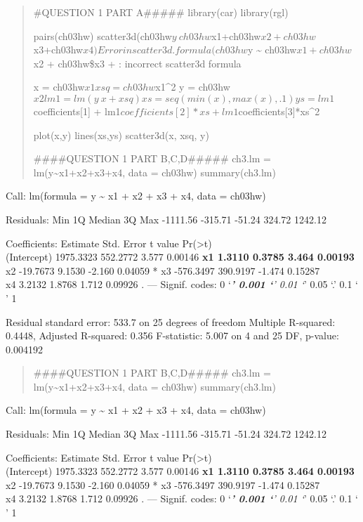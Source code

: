 \documentclass[
]{article}
\author{}
\date{\vspace{-2.5em}}
\begin{document}
\begin{quote}
\#QUESTION 1 PART A\#\#\#\#\# library(car) library(rgl)

pairs(ch03hw)
scatter3d(ch03hw\(y~ch03hw\)x1+ch03hw\(x2+ch03hw\)x3+ch03hw\(x4) Error in scatter3d.formula(ch03hw\)y
\textasciitilde{} ch03hw\(x1 + ch03hw\)x2 + ch03hw\$x3 + : incorrect
scatter3d formula

x = ch03hw\(x1 xsq = ch03hw\)x1\^{}2 y =
ch03hw\(x2 lm1 = lm(y~x+xsq) xs = seq(min(x), max(x), .1) ys = lm1\)coefficients{[}1{]}
+ lm1\(coefficients[2]*xs + lm1\)coefficients{[}3{]}*xs\^{}2

plot(x,y) lines(xs,ys) scatter3d(x, xsq, y)

\#\#\#\#QUESTION 1 PART B,C,D\#\#\#\#\# ch3.lm =
lm(y\textasciitilde x1+x2+x3+x4, data = ch03hw) summary(ch3.lm)
\end{quote}

Call: lm(formula = y \textasciitilde{} x1 + x2 + x3 + x4, data = ch03hw)

Residuals: Min 1Q Median 3Q Max -1111.56 -315.71 -51.24 324.72 1242.12

Coefficients: Estimate Std. Error t value
Pr(\textgreater\textbar t\textbar)\\
(Intercept) 1975.3323 552.2772 3.577 0.00146 \textbf{ x1 1.3110 0.3785
3.464 0.00193 } x2 -19.7673 9.1530 -2.160 0.04059 * x3 -576.3497
390.9197 -1.474 0.15287\\
x4 3.2132 1.8768 1.712 0.09926 . --- Signif. codes: 0 `\emph{\textbf{'
0.001 `}' 0.01 `}' 0.05 `.' 0.1 ` ' 1

Residual standard error: 533.7 on 25 degrees of freedom Multiple
R-squared: 0.4448, Adjusted R-squared: 0.356 F-statistic: 5.007 on 4 and
25 DF, p-value: 0.004192

\begin{quote}
\#\#\#\#QUESTION 1 PART B,C,D\#\#\#\#\# ch3.lm =
lm(y\textasciitilde x1+x2+x3+x4, data = ch03hw) summary(ch3.lm)
\end{quote}

Call: lm(formula = y \textasciitilde{} x1 + x2 + x3 + x4, data = ch03hw)

Residuals: Min 1Q Median 3Q Max -1111.56 -315.71 -51.24 324.72 1242.12

Coefficients: Estimate Std. Error t value
Pr(\textgreater\textbar t\textbar)\\
(Intercept) 1975.3323 552.2772 3.577 0.00146 \textbf{ x1 1.3110 0.3785
3.464 0.00193 } x2 -19.7673 9.1530 -2.160 0.04059 * x3 -576.3497
390.9197 -1.474 0.15287\\
x4 3.2132 1.8768 1.712 0.09926 . --- Signif. codes: 0 `\emph{\textbf{'
0.001 `}' 0.01 `}' 0.05 `.' 0.1 ` ' 1
\end{document}
